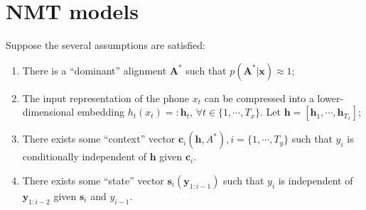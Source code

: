 \documentclass[journal]{IEEEtran}
\begin{document}


\section{NMT models}
Suppose the several assumptions are satisfied:
\begin{enumerate}
    \item There is a ``dominant'' alignment $\mathbf A^*$ such that $p(\mathbf A^*|\mathbf x) \approx 1$;
    \item The input representation of the phone $x_t$ can be compressed into a lower-dimensional embedding $h_t(x_t) =: \mathbf h_t$, $\forall t \in \{1, \cdots, T_x\}$. Let $\mathbf h = [\mathbf h_1, \cdots, \mathbf h_{T_x}]$;
    \item There exists some ``context'' vector $\mathbf c_i(\mathbf h, A^*), i=\{1, \cdots, T_y\}$ such that $y_i$ is conditionally independent of $\mathbf h$ given $\mathbf c_i$.
    \item There exists some ``state'' vector $\mathbf s_i(\mathbf y_{1:i-1})$ such that $y_i$ is independent of $\mathbf y_{1:i-2}$ given $\mathbf s_i$ and $y_{i-1}$.
\end{enumerate}
\end{document}
